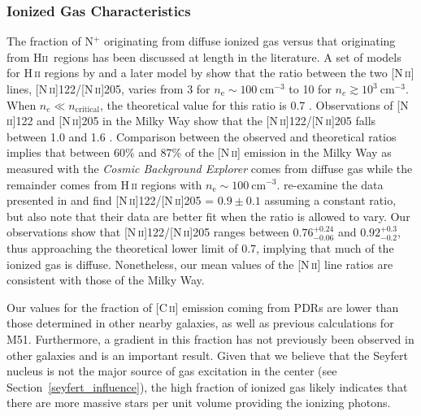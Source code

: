 \subsubsection{Ionized Gas Characteristics}
The fraction of N$^{+}$ originating from diffuse ionized gas versus that originating from H\textsc{ii}~regions has been discussed at length in the literature.  A set of models for H\,\textsc{ii} regions by \citet{1985ApJS...57..349R} and a later model by \citet{1994ApJ...420..772R} show that the ratio between the two [N\,\textsc{ii}] lines, [N\,\textsc{ii}]122/[N\,\textsc{ii}]205, varies from 3 for $n_{\mathrm{e}} \sim 100~\mathrm{cm}^{-3}$ to 10 for $n_{e} \gtrsim 10^{3}~\mathrm{cm}^{-3}$.  When $n_{e} \ll n_{\mathrm{critical}}$, the theoretical value for this ratio is 0.7 \citep{1991ApJ...381..200W,1994ApJ...434..587B}.  Observations of [N\,\textsc{ii}]122 and [N\,\textsc{ii}]205 in the Milky Way show that the [N\,\textsc{ii}]122/[N\,\textsc{ii}]205 falls between 1.0 and 1.6 \citep{1991ApJ...381..200W}.  Comparison between the observed and theoretical ratios implies that between 60\% and 87\% of the [N\,\textsc{ii}] emission in the Milky Way as measured with the \emph{Cosmic Background Explorer} comes from diffuse gas while the remainder comes from H\,\textsc{ii} regions with $n_{\mathrm{e}} \sim 100~\mathrm{cm}^{-3}$.  \citet{1994ApJ...434..587B} re-examine the data presented in \citet{1991ApJ...381..200W} and find [N\,\textsc{ii}]122/[N\,\textsc{ii}]205 = $0.9 \pm 0.1$ assuming a constant ratio, but also note that their data are better fit when the ratio is allowed to vary.  Our observations show that [N\,\textsc{ii}]122/[N\,\textsc{ii}]205 ranges between $0.76^{+0.24}_{-0.06}$ and $0.92^{+0.3}_{-0.2}$, thus approaching the theoretical lower limit of 0.7, implying that much of the ionized gas is diffuse.  Nonetheless, our mean values of the [N\,\textsc{ii}] line ratios are consistent with those of the Milky Way.

Our values for the fraction of [C\,\textsc{ii}] emission coming from PDRs are lower than those determined in other nearby galaxies, as well as previous calculations for M51.  Furthermore, a gradient in this fraction has not previously been observed in other galaxies and is an important result.  Given that we believe that the Seyfert nucleus is not the major source of gas excitation in the center (see Section~\ref{seyfert_influence}), the high fraction of ionized gas likely indicates that there are more massive stars per unit volume providing the ionizing photons.

